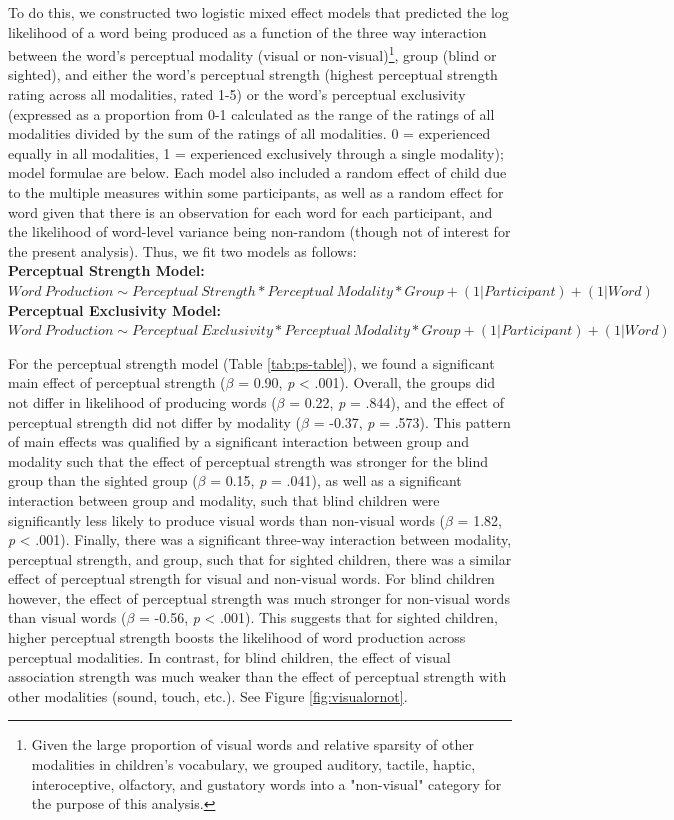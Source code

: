 \documentclass[
  man,floatsintext]{apa6}
\begin{document}
To do this, we constructed two logistic mixed effect models that predicted the log likelihood of a word being produced as a function of the three way interaction between the word's perceptual modality (visual or non-visual)\footnote{Given the large proportion of visual words and relative sparsity of other modalities in children's vocabulary, we grouped auditory, tactile, haptic, interoceptive, olfactory, and gustatory words into a "non-visual" category for the purpose of this analysis.}, group (blind or sighted), and either the word's perceptual strength (highest perceptual strength rating across all modalities, rated 1-5) or the word's perceptual exclusivity (expressed as a proportion from 0-1 calculated as the range of the ratings of all modalities divided by the sum of the ratings of all modalities. 0 = experienced equally in all modalities, 1 = experienced exclusively through a single modality); model formulae are below. Each model also included a random effect of child due to the multiple measures within some participants, as well as a random effect for word given that there is an observation for each word for each participant, and the likelihood of word-level variance being non-random (though not of interest for the present analysis). Thus, we fit two models as follows:\\
\textbf{Perceptual Strength Model:} \(Word\ Production \sim Perceptual\ Strength * Perceptual\ Modality * Group + (1|Participant) + (1|Word)\)\\
\textbf{Perceptual Exclusivity Model:} \(Word\ Production \sim Perceptual\ Exclusivity * Perceptual\ Modality * Group + (1|Participant) + (1|Word)\)

For the perceptual strength model (Table \ref{tab:ps-table}), we found a significant main effect of perceptual strength (\(\beta\) = 0.90, \emph{p} \textless{} .001). Overall, the groups did not differ in likelihood of producing words (\(\beta\) = 0.22, \emph{p} = .844), and the effect of perceptual strength did not differ by modality (\(\beta\) = -0.37, \emph{p} = .573). This pattern of main effects was qualified by a significant interaction between group and modality such that the effect of perceptual strength was stronger for the blind group than the sighted group (\(\beta\) = 0.15, \emph{p} = .041), as well as a significant interaction between group and modality, such that blind children were significantly less likely to produce visual words than non-visual words (\(\beta\) = 1.82, \emph{p} \textless{} .001). Finally, there was a significant three-way interaction between modality, perceptual strength, and group, such that for sighted children, there was a similar effect of perceptual strength for visual and non-visual words. For blind children however, the effect of perceptual strength was much stronger for non-visual words than visual words (\(\beta\) = -0.56, \emph{p} \textless{} .001). This suggests that for sighted children, higher perceptual strength boosts the likelihood of word production across perceptual modalities. In contrast, for blind children, the effect of visual association strength was much weaker than the effect of perceptual strength with other modalities (sound, touch, etc.). See Figure \ref{fig:visualornot}.
\end{document}
